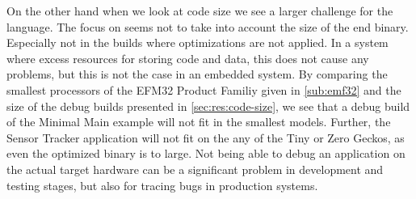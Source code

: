 On the other hand when we look at code size we see a larger challenge for the {\rust} language.
The focus on  seems not to take into account the size of the end binary.
Especially not in the builds where optimizations are not applied.
In a system where excess resources for storing code and data, this does not cause any problems, but this is not the case in an embedded system.
By comparing the smallest processors of the EFM32 Product Familiy given in \autoref{sub:emf32} and the size of the debug builds presented in \autoref{sec:res:code-size}, we see that a debug build of the Minimal Main example will not fit in the smallest models.
Further, the Sensor Tracker application will not fit on the any of the Tiny or Zero Geckos, as even the optimized binary is to large.
Not being able to debug an application on the actual target hardware can be a significant problem in development and testing stages, but also for tracing bugs in production systems.
